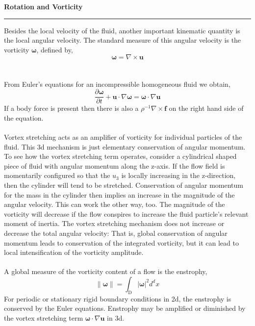 \documentclass[12pt]{article}
\begin{document}
\pagebreak

\begin{huge}
\begin{center}
\textbf{Rotation and Vorticity}
\noindent\rule{16.5cm}{0.4pt}
\end{center}
\end{huge}

\begin{flushleft}
Besides the local velocity of the fluid, another important kinematic quantity is the local angular velocity. The standard measure of this angular velocity is the vorticity $\boldsymbol\omega$, defined by,
$$\boldsymbol\omega = \nabla \times \textbf{u}$$
\\~\\
From Euler's equations for an incompressible homogeneous fluid we obtain,
$$\frac{\partial \boldsymbol\omega}{\partial t} + \textbf{u}\cdot\nabla\boldsymbol\omega = \boldsymbol\omega\cdot\nabla\textbf{u}$$
If a body force is present then there is also a $\rho^{-1}\nabla\times \textbf{f}$ on the right hand side of the equation.
\\~\\
Vortex stretching acts as an amplifier of vorticity for individual particles of the fluid. This 3d mechanism is just elementary conservation of angular momentum. To see how the vortex stretching term operates, consider a cylindrical shaped piece of fluid with angular momentum along the z-axis. If the flow field is momentarily configured so that the $u_3$ is locally increasing in the z-direction, then the cylinder will tend to be stretched. Conservation of angular momentum for the mass in the cylinder then implies an increase in the magnitude of the angular velocity. This can work the other way, too. The magnitude of the vorticity will decrease if the flow conspires to increase the fluid particle's relevant moment of inertia. The vortex stretching mechanism does not increase or decrease the total angular velocity: That is, global conservation of angular momentum leads to conservation of the integrated vorticity, but it can lead to local intensification of the vorticity amplitude.
\\~\\
A global measure of the vorticity content of a flow is the enstrophy,
$$\|\boldsymbol\omega\| = \int_{\text{D}}|\boldsymbol\omega|^2d^dx$$
For periodic or stationary rigid boundary conditions in 2d, the enstrophy is conserved by the Euler equations. Enstrophy may be amplified or diminished by the vortex stretching term $\boldsymbol\omega\cdot\nabla\textbf{u}$ in 3d.

\end{flushleft}
\end{document}
